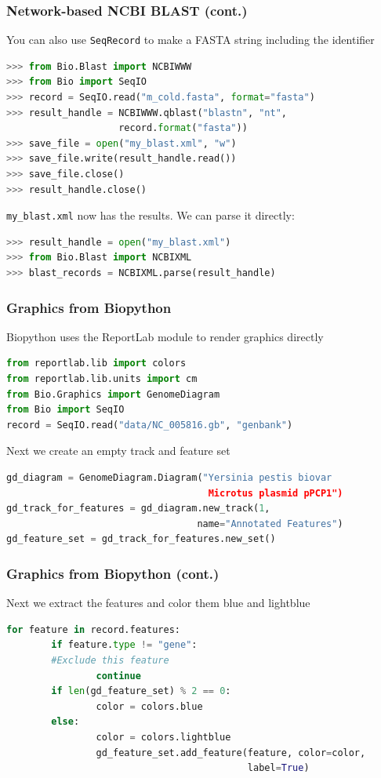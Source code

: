 \documentclass[xcolor=table,10pt,final]{beamer}
\begin{document}
\begin{frame}[fragile]
	\frametitle{Network-based NCBI BLAST (cont.)}
	You can also use \texttt{SeqRecord} to make a FASTA string including the 			identifier
	\begin{lstlisting}[language=python]
>>> from Bio.Blast import NCBIWWW
>>> from Bio import SeqIO
>>> record = SeqIO.read("m_cold.fasta", format="fasta")
>>> result_handle = NCBIWWW.qblast("blastn", "nt",
                    record.format("fasta"))
>>> save_file = open("my_blast.xml", "w")
>>> save_file.write(result_handle.read())
>>> save_file.close()
>>> result_handle.close()
	\end{lstlisting}
	\texttt{my\_blast.xml} now has the results.  We can parse it directly:
	\begin{lstlisting}[language=python]
>>> result_handle = open("my_blast.xml")
>>> from Bio.Blast import NCBIXML
>>> blast_records = NCBIXML.parse(result_handle)
	\end{lstlisting}
\end{frame}


\begin{frame}[fragile]
	\frametitle{Graphics from Biopython}
	Biopython uses the ReportLab module to render graphics directly
	\begin{lstlisting}[language=python]
from reportlab.lib import colors
from reportlab.lib.units import cm
from Bio.Graphics import GenomeDiagram
from Bio import SeqIO
record = SeqIO.read("data/NC_005816.gb", "genbank")
	\end{lstlisting}
Next we create an empty track and feature set
	\begin{lstlisting}[language=python]
gd_diagram = GenomeDiagram.Diagram("Yersinia pestis biovar
                                    Microtus plasmid pPCP1")
gd_track_for_features = gd_diagram.new_track(1,
                                  name="Annotated Features")
gd_feature_set = gd_track_for_features.new_set()
	\end{lstlisting}
\end{frame}



\begin{frame}[fragile]
	\frametitle{Graphics from Biopython (cont.)}	Next we extract the features and color them blue and lightblue
	\begin{lstlisting}[language=python]
for feature in record.features:
        if feature.type != "gene":
        #Exclude this feature
                continue
        if len(gd_feature_set) % 2 == 0:
                color = colors.blue
        else:
                color = colors.lightblue
                gd_feature_set.add_feature(feature, color=color,
                                           label=True)
	\end{lstlisting}
\end{frame}
\end{document}
